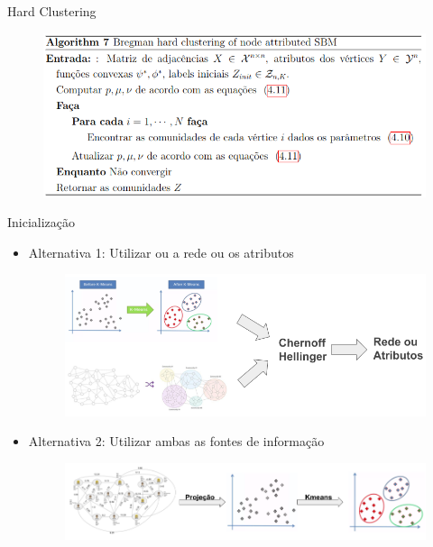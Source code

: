 \documentclass[aspectratio=169]{beamer}
\begin{document}
\begin{frame}{Hard Clustering}
	\begin{figure}
		\includegraphics[scale=0.45]{img/HardBregmanSBM.png}
	\end{figure}
\end{frame}



\begin{frame}{Inicialização}
	\begin{itemize}
		\item Alternativa 1:
			Utilizar ou a rede ou os atributos
			\begin{figure}
				\includegraphics[scale=0.25]{img/InitProcedures.png}
			\end{figure}
		\item Alternativa 2:
			Utilizar ambas as fontes de informação
		\begin{figure}
			\includegraphics[scale=0.4]{img/SpectralClustering.png}
		\end{figure}
	\end{itemize}
\end{frame}
\end{document}
